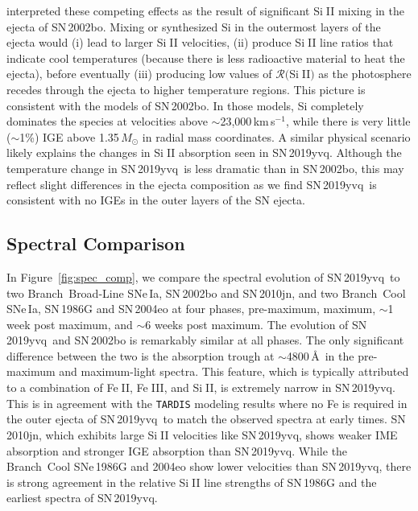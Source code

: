 \documentclass[twocolumn]{aastex63}
\def\ion#1#2{#1$\;${\footnotesize\rm{#2}}\relax}
\newcommand{\kms}{km\,s$^{-1}$}
\newcommand{\sn}{SN\,2019yvq}
\begin{document}
\citet{Benetti04} interpreted these competing effects as the result of
significant \ion{Si}{II} mixing in the ejecta of SN\,2002bo. Mixing or
synthesized Si in the outermost layers of the ejecta would (i) lead to larger
\ion{Si}{II} velocities, (ii) produce \ion{Si}{II} line ratios that indicate
cool temperatures (because there is less radioactive material to heat the
ejecta), before eventually (iii) producing low values of
$\mathcal{R}($\ion{Si}{II}$)$ as the photosphere recedes through the ejecta to
higher temperature regions. This picture is consistent with the
\citet{Stehle05} models of SN\,2002bo. In those models, Si completely
dominates the species at velocities above $\sim$23,000\,\kms, while there is
very little ($\sim$1\%) IGE above 1.35\,$M_\odot$ in radial mass
coordinates. A similar physical scenario likely explains the changes in
\ion{Si}{II} absorption seen in \sn. Although the temperature change in \sn\
is less dramatic than in SN\,2002bo, this may reflect slight differences in
the ejecta composition as we find \sn\ is consistent with no IGEs in the outer
layers of the SN ejecta.

\subsection{Spectral Comparison}\label{sec:spec_comp}

In Figure~\ref{fig:spec_comp}, we compare the spectral evolution of \sn\ to
two Branch~Broad-Line SNe\,Ia, SN\,2002bo and SN\,2010jn, and two Branch~Cool
SNe\,Ia, SN\,1986G and SN\,2004eo \citep{Cristiani92,
Benetti04,Pastorello07,Silverman11,Hachinger13,Maguire14} at four phases,
pre-maximum, maximum, $\sim$1 week post maximum, and $\sim$6 weeks post
maximum. The evolution of \sn\ and SN\,2002bo is remarkably similar at all
phases. The only significant difference between the two is the absorption
trough at $\sim$4800\,\AA\ in the pre-maximum and maximum-light spectra. This
feature, which is typically attributed to a combination of \ion{Fe}{II},
\ion{Fe}{III}, and \ion{Si}{II}, is extremely narrow in \sn. This is in
agreement with the \texttt{TARDIS} modeling results where no Fe is required in
the outer ejecta of \sn\ to match the observed spectra at early times.
SN\,2010jn, which exhibits large \ion{Si}{II} velocities like \sn, shows
weaker IME absorption and stronger IGE absorption than \sn. While the
Branch~Cool SNe\,1986G and 2004eo show lower velocities than \sn, there is
strong agreement in the relative \ion{Si}{II} line strengths of SN\,1986G and
the earliest spectra of \sn.
\end{document}
